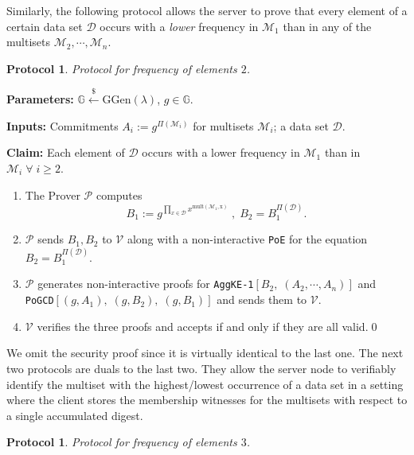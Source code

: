 \documentclass[11pt, lettersize, notitlepage, leqno, footskip=0.6cm]{article}
\newcommand{\pl}{\prod\limits}
\newcommand{\mc}{\mathcal}
\newcommand{\mb}{\mathbb}
\newcommand{\mr}{\mathrm}
\newcommand{\lamb}{\lambda}
\newcommand{\mP}{\mc{P}}
\newcommand{\V}{\mc{V}}
\newcommand{\vs}{\vspace{-0.15cm}}
\newcommand{\noin}{\noindent}
\newtheorem{Prot}[Thm]{Protocol}
\numberwithin{equation}{section}
\begin{document}
\vspace{0.2cm}

Similarly, the following protocol allows the server to prove that every element of a certain data set $\mc{D}$ occurs with a \textit{lower} frequency in $\mc{M}_1$ than in any of the multisets $\mc{M}_2,\cdots,\mc{M}_n$.

\begin{Prot} Protocol for frequency of elements $2$.\end{Prot} \vspace{-0.3cm}

\noin \textbf{Parameters:} $\mb{G}\xleftarrow{\$} \mr{GGen}(\lamb)$,\; $g\in \mb{G}$.

\noin \textbf{Inputs:} Commitments $A_i := g^{\Pi(\mc{M}_i)}$ for multisets $\mc{M}_i$; a data set $\mc{D}$.

\noin \textbf{Claim:} Each element of $\mc{D}$ occurs with a lower frequency in $\mc{M}_1$ than in $\mc{M}_i\;\forall\;i\geq 2$. \vs

\begin{enumerate}[wide, labelwidth=!, labelindent=0pt] \vs

\item The Prover $\mP$ computes \vs $$B_1:= g^{\pl_{x\in\mc{D}} x^{\mr{mult(\mc{M}_1, x)}}}\;,\; B_2 = B_1^{\Pi(\mc{D})}.$$ \vspace{-0.8cm}

\item $\mP$ sends $B_1, B_2$ to $\V$ along with a non-interactive \verb|PoE| for the equation $B_2= B_1^{\Pi(\mc{D})}$. \vs

\item $\mP$ generates non-interactive proofs for \verb|AggKE-1|$[B_2,\;(A_2,\cdots,A_n)]$ and\\ \verb|PoGCD|$[(g, A_1),\;(g, B_2),\;(g,B_1)]$ and sends them to $\V$. \vs

\item $\V$ verifies the three proofs and accepts if and only if they are all valid.\qed\end{enumerate}

We omit the security proof since it is virtually identical to the last one. The next two protocols are duals to the last two. They allow the server node to verifiably identify the multiset with the highest/lowest occurrence of a data set in a setting where the client stores the membership witnesses for the multisets with respect to a single accumulated digest.

\begin{Prot} Protocol for frequency of elements $3$.\end{Prot} \vspace{-0.3cm}
\end{document}
